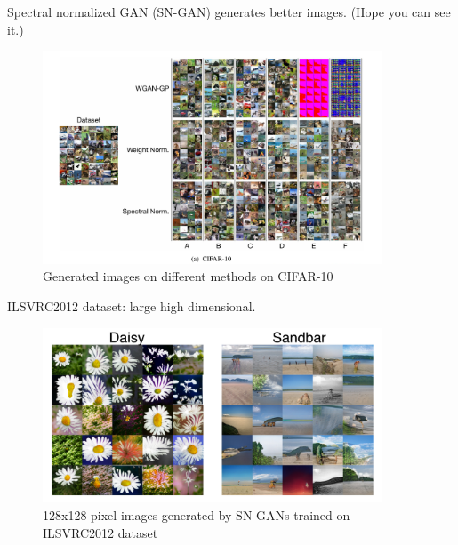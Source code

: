 \documentclass[xcolor={svgnames}]{beamer}
\begin{document}
\begin{frame}
  Spectral normalized GAN (SN-GAN) generates better images. (Hope you can
  see it.)
  \begin{figure}[bp]
    \centering
    \includegraphics[width=0.9\textwidth]{figures/generated.png}
    \caption{Generated images on different methods on CIFAR-10}
    \label{fig:generated}
  \end{figure}
\end{frame}
\begin{frame}
  ILSVRC2012 dataset: large high dimensional.
  \begin{figure}[bp]
    \centering
    \includegraphics[width=0.9\textwidth]{figures/generated-ilsvr.png}
    \caption{128x128 pixel images generated by SN-GANs trained on ILSVRC2012
    dataset}
    \label{fig:generated-ilsvr}
  \end{figure}
\end{frame}
\end{document}
